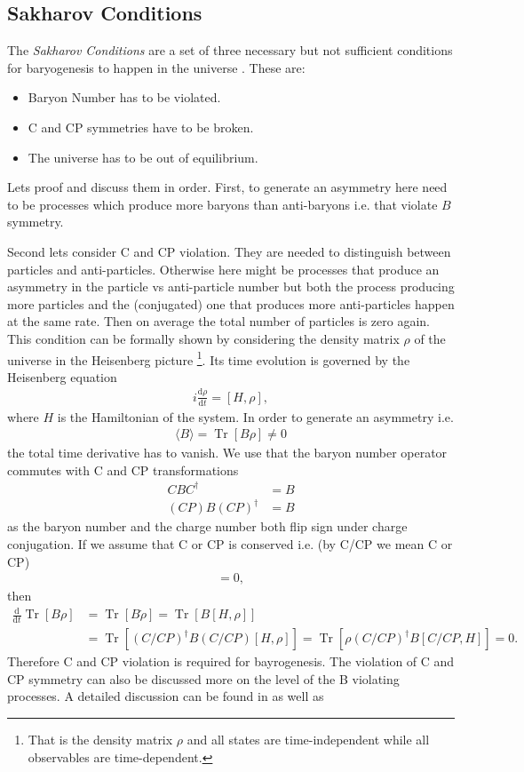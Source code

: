 \documentclass[13pt,a4paper,twoside,titlepage]{article}
\newcommand{\Tr}{\operatorname{Tr}}
\begin{document}
\subsection{Sakharov Conditions}
The \emph{Sakharov Conditions} are a set of three necessary but not sufficient conditions for baryogenesis to happen in the universe \cite{Sakharov_1991}. These are:
\begin{itemize}
    \item Baryon Number has to be violated.
    \item C and CP symmetries have to be broken.
    \item The universe has to be out of equilibrium.
\end{itemize}
Lets proof and discuss them in order.
First, to generate an asymmetry here need to be processes which produce more baryons than anti-baryons i.e. that violate $B$ symmetry.

Second lets consider C and CP violation. They are needed to distinguish between particles and anti-particles. Otherwise here might be processes that produce an asymmetry in the
particle vs anti-particle number but both the process producing more particles and the (conjugated) one that produces more anti-particles happen at the same rate.
Then on average the total number of particles is zero again.
This condition can be formally shown by considering the density matrix $\rho$ of the universe in the Heisenberg picture \footnote{That is the density matrix $\rho$ and all states are time-independent while all observables are time-dependent.}. Its time evolution is governed by the Heisenberg equation
\begin{align}
    i \frac{\mathrm{d} \rho}{\mathrm{d} t} = [H, \rho],
\end{align}
where $H$ is the Hamiltonian of the system.
In order to generate an asymmetry i.e.
\begin{align}
    \langle B \rangle = \Tr [ B \rho ] \neq 0
\end{align}
the total time derivative has to vanish.
We use that the baryon number operator commutes with C and CP transformations
\begin{align}
    C B C^\dagger &= B \\
    (C P) B (C P)^\dagger &= B
\end{align}
as the baryon number and the charge number both flip sign under charge conjugation.
If we assume that C or CP is conserved i.e. (by C/CP we mean C or CP)
\begin{align}
[H, C/CP] = 0,
\end{align}
then
\begin{align}
    \frac{\mathrm{d}}{\mathrm{d} t} \Tr [ B \rho ] &= \Tr [ B \dot{\rho} ] = \Tr [ B [H, \rho] ] \\
    &= \Tr [ (C/CP)^\dagger B (C/CP) [H, \rho] ] = \Tr [ \rho (C/CP)^\dagger B [C/CP, H] ] = 0.
\end{align}
Therefore C and CP violation is required for bayrogenesis. The violation of C and CP symmetry can also be discussed more on the level of the B violating processes. A detailed discussion can be found in \cite[sec 2.3]{Cline:2006ts_Baryogenesis} as well as %
\end{document}
